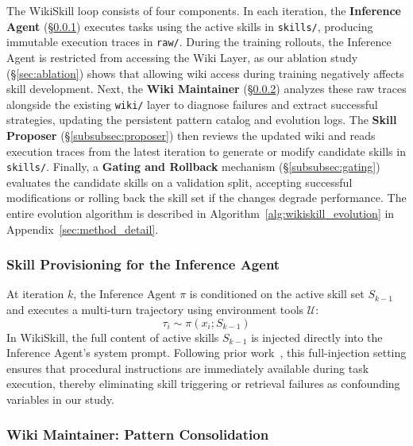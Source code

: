 \documentclass[11pt, a4paper, copyright, gr]{google}
\newcommand{\method}{WikiSkill\xspace}
\begin{document}
The \method loop consists of four components. In each iteration, the \textbf{Inference Agent} (\S\ref{subsubsec:inference}) executes tasks using the active skills in \texttt{skills/}, producing immutable execution traces in \texttt{raw/}. During the training rollouts, the Inference Agent is restricted from accessing the Wiki Layer, as our ablation study (\S\ref{sec:ablation}) shows that allowing wiki access during training negatively affects skill development. Next, the \textbf{Wiki Maintainer} (\S\ref{subsubsec:maintenance}) analyzes these raw traces alongside the existing \texttt{wiki/} layer to diagnose failures and extract successful strategies, updating the persistent pattern catalog and evolution logs. The \textbf{Skill Proposer} (\S\ref{subsubsec:proposer}) then reviews the updated wiki and reads execution traces from the latest iteration to generate or modify candidate skills in \texttt{skills/}. Finally, a \textbf{Gating and Rollback} mechanism (\S\ref{subsubsec:gating}) evaluates the candidate skills on a validation split, accepting successful modifications or rolling back the skill set if the changes degrade performance. The entire evolution algorithm is described in Algorithm~\ref{alg:wikiskill_evolution} in Appendix~\ref{sec:method_detail}.

\subsubsection{Skill Provisioning for the Inference Agent}
\label{subsubsec:inference}

At iteration $k$, the Inference Agent $\pi$ is conditioned on the active skill set $S_{k-1}$ and executes a multi-turn trajectory using environment tools $\mathcal{U}$:
\begin{equation}
\tau_i \sim \pi(x_i; S_{k-1})
\end{equation}
In \method, the full content of active skills $S_{k-1}$ is injected directly into the Inference Agent's system prompt. Following prior work~\citep{yang2026skillopt, ni2026trace2skill}, this full-injection setting ensures that procedural instructions are immediately available during task execution, thereby eliminating skill triggering or retrieval failures as confounding variables in our study.

\subsubsection{Wiki Maintainer: Pattern Consolidation}
\label{subsubsec:maintenance}
\end{document}
